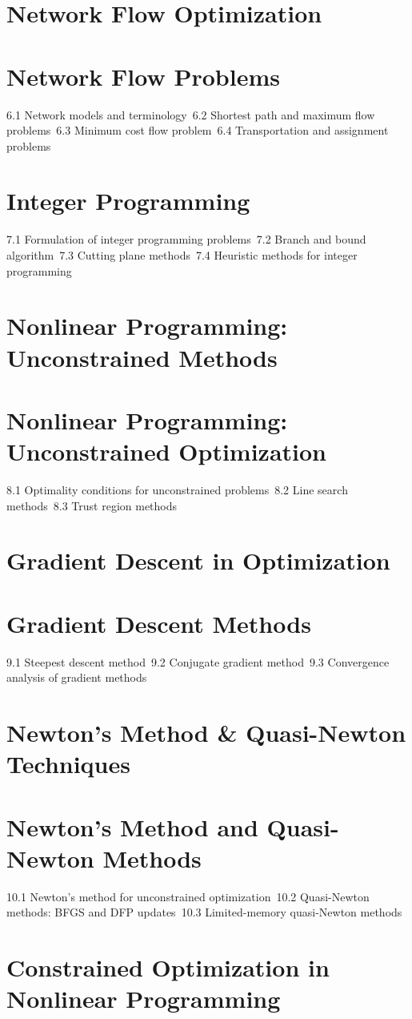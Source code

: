 \section{Network Flow Optimization}
\section{Network Flow Problems}
6.1 Network models and terminology\
6.2 Shortest path and maximum flow problems\
6.3 Minimum cost flow problem\
6.4 Transportation and assignment problems\
\section{Integer Programming}
7.1 Formulation of integer programming problems\
7.2 Branch and bound algorithm\
7.3 Cutting plane methods\
7.4 Heuristic methods for integer programming\
\section{Nonlinear Programming: Unconstrained Methods}
\section{Nonlinear Programming: Unconstrained Optimization}
8.1 Optimality conditions for unconstrained problems\
8.2 Line search methods\
8.3 Trust region methods\
\section{Gradient Descent in Optimization}
\section{Gradient Descent Methods}
9.1 Steepest descent method\
9.2 Conjugate gradient method\
9.3 Convergence analysis of gradient methods\
\section{Newton's Method \& Quasi-Newton Techniques}
\section{Newton's Method and Quasi-Newton Methods}
10.1 Newton's method for unconstrained optimization\
10.2 Quasi-Newton methods: BFGS and DFP updates\
10.3 Limited-memory quasi-Newton methods\
\section{Constrained Optimization in Nonlinear Programming}
